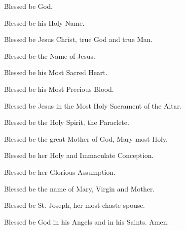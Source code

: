 \begin{enpars}

Blessed be God. 

Blessed be his Holy Name. 

Blessed be Jesus Christ, true God and true Man.
 
Blessed be the Name of Jesus.

Blessed be his Most Sacred Heart.

Blessed be his Most Precious Blood.

Blessed be Jesus in the Most Holy Sacrament of the Altar.

Blessed be the Holy Spirit, the Paraclete.

Blessed be the great Mother of God, Mary most Holy.

Blessed be her Holy and Immaculate Conception.


Blessed be her Glorious Assumption.

Blessed be the name of Mary, Virgin and Mother.

Blessed be St. Joseph, her most chaste spouse.

Blessed be God in his Angels and in his Saints. Amen.
\end{enpars}
